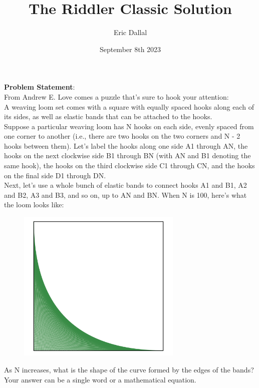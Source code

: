\documentclass[10pt,a4paper]{article}
\title{The Riddler Classic Solution}
\date{September 8th 2023}
\author{Eric Dallal}
\begin{document}
\maketitle
\textbf{Problem Statement}:\\

From Andrew E. Love comes a puzzle that’s sure to hook your attention:\\

A weaving loom set comes with a square with equally spaced hooks along each of its sides, as well as elastic bands that can be attached to the hooks.\\

Suppose a particular weaving loom has N hooks on each side, evenly spaced from one corner to another (i.e., there are two hooks on the two corners and N - 2 hooks between them). Let’s label the hooks along one side A1 through AN, the hooks on the next clockwise side B1 through BN (with AN and B1 denoting the same hook), the hooks on the third clockwise side C1 through CN, and the hooks on the final side D1 through DN.\\

Next, let’s use a whole bunch of elastic bands to connect hooks A1 and B1, A2 and B2, A3 and B3, and so on, up to AN and BN. When N is 100, here’s what the loom looks like:\\
\begin{figure}[h!]
\centering
\includegraphics[width=0.7\textwidth]{Loom}
\end{figure}

As N increases, what is the shape of the curve formed by the edges of the bands? Your answer can be a single word or a mathematical equation.\\
\end{document}
